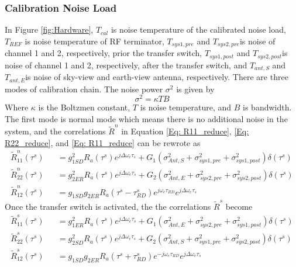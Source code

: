 \documentclass[draftcls,onecolumn]{IEEEtran}  %
\begin{document}
\subsubsection{Calibration Noise Load}
In Figure \ref{fig:Hardware}, $T_{cal}$ is noise temperature of the calibrated noise load, $T_{REF}$ is noise temperature of RF terminator, $T_{sys1,pre}$ and $T_{sys2,pre}$is noise of channel 1 and 2, respectively, prior the transfer switch, $T_{sys1,post}$ and $T_{sys2,post}$is noise of channel 1 and 2, respectively, after the transfer switch, and $T_{ant,S}$ and $T_{ant,E}$is noise of sky-view and earth-view antenna, respectively. There are three modes of calibration chain. The noise power $\sigma^2$ is given by
\begin{equation}
	\sigma^2=\kappa TB
\end{equation}
Where $\kappa$ is the Boltzmen constant, $T$ is noise temperature, and $B$ is bandwidth. The first mode is normal mode which means there is no additional noise in the system, and the correlations $\tilde{R}^n$ in Equation \ref{Eq: R11_reduce}, \ref{Eq: R22_reduce}, and \ref{Eq: R11_reduce} can be rewrote as
\begin{eqnarray}
	\tilde{R}_{11}^n(\tau^s) &&= g^2_{1SD} R_a(\tau^s)e^{j\Delta\omega_e\tau_s}+
G_1(\sigma^2_{Ant,S}+\sigma^2_{sys1,pre} +\sigma^2_{sys1,post}) \delta(\tau^s)                                      
\label{Eq: R11_reduce_norm} \\
	\tilde{R}_{22}^n(\tau^s) &&= g^2_{2ER} R_a(\tau^s)e^{j\Delta\omega_e\tau_s}+
G_2(\sigma^2_{Ant,E}+\sigma^2_{sys2,pre} +\sigma^2_{sys2,post}) \delta(\tau^s)                                       
\label{Eq: R22_reduce_norm} \\
	\tilde{R}_{12}^n(\tau^s) &&= g_{1SD} g_{2ER} R_a(\tau^s-\tau^s_{RD})e^{j\omega_e \tau_{RD}} e^{j\Delta\omega_e\tau_s}  
\label{Eq: R12_reduce_norm}
\end{eqnarray}
Once the transfer switch is activated, the the correlations $\tilde{R}^s$ become
\begin{eqnarray}
\tilde{R}_{11}^s(\tau^s) &&= g^2_{1ER} R_a(\tau^s)e^{j\Delta\omega_e\tau_s}+
G_1(\sigma^2_{Ant,E}+\sigma^2_{sys2,pre} +\sigma^2_{sys1,post}) \delta(\tau^s)                                       
\label{Eq: R22_reduce_swap} \\
\tilde{R}_{22}^s(\tau^s) &&= g^2_{2SD} R_a(\tau^s)e^{j\Delta\omega_e\tau_s}+
G_2(\sigma^2_{Ant,S}+\sigma^2_{sys1,pre} +\sigma^2_{sys2,post}) \delta(\tau^s)                                      
\label{Eq: R11_reduce_swap} \\
	\tilde{R}_{12}^s(\tau^s) &&= g_{1SD} g_{2ER} R_a(\tau^s+\tau^s_{RD})e^{-j\omega_e \tau_{RD}} e^{j\Delta\omega_e\tau_s}  
\label{Eq: R12_reduce_swap}
\end{eqnarray}
\end{document}
